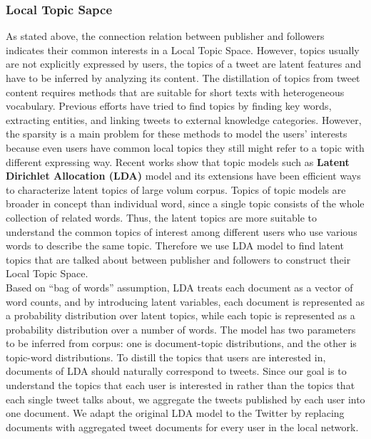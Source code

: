\documentclass{acm_proc_article-sp}
\begin{document}
\subsubsection{Local Topic Sapce}
As stated above, the connection relation between publisher and followers indicates their common interests in a Local Topic Space. 
However, topics usually are not explicitly expressed by users, the topics of a tweet are latent features and have to be inferred by analyzing its content.
The distillation of topics from tweet content requires methods that are suitable for short texts with heterogeneous vocabulary. 
Previous efforts have tried to find topics by finding key words\cite{Chen:2010STE}, extracting  entities\cite{Abel:2011AUM}, and linking tweets to external knowledge categories\cite{conf/icwsm/MacskassyM11}.
However, the sparsity is a main problem for these methods to model the users' interests because even users have common local topics they still might refer to a topic with different expressing way.
Recent works show that topic models such as \textbf{Latent Dirichlet Allocation (LDA)} model and its extensions\cite{blei2003latent,conf/wsdm/WengLJH10} have been efficient ways to characterize latent topics of large volum corpus. 
Topics of topic models are broader in concept than individual word, since a single topic consists of the whole collection of related words. 
Thus, the latent topics are more suitable to understand the common topics of interest among different users who use various words to describe the same topic.
Therefore we use LDA model to find latent topics that are talked about between publisher and followers to construct their Local Topic Space. \\
Based on “bag of words” assumption, LDA treats each document as a vector of word counts, and by introducing latent variables, each document is represented as a probability distribution over latent topics, while each topic is represented as a probability distribution over a number of words. 
The model has two parameters to be inferred from corpus: one is  document-topic distributions, and the other is topic-word distributions. 
To distill the topics that users are interested in, documents of LDA should naturally correspond to tweets. 
Since our goal is to understand the topics that each user is interested in rather than the topics that each single tweet talks about, we aggregate the tweets published by each user into one document. 
We adapt the original LDA model to the Twitter by replacing documents with aggregated tweet documents for every user in the local network. 
\end{document}
